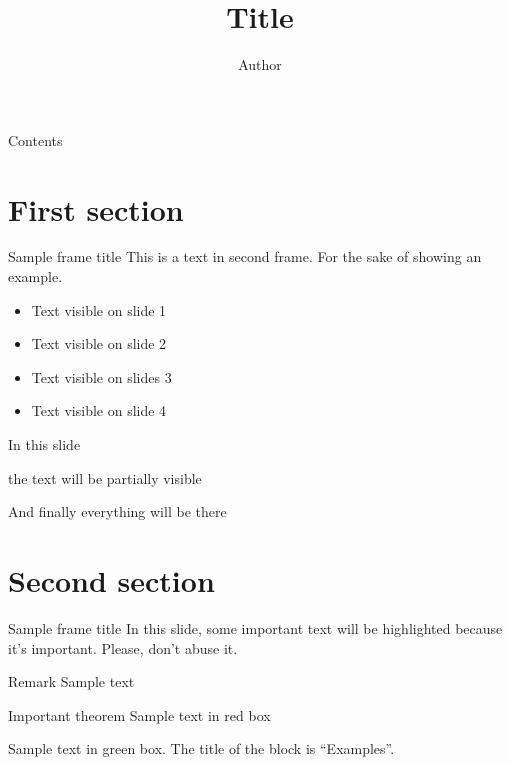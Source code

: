 \documentclass{ibeamer}
\author{Author}
\institute{Institute}
\title{Title}
\begin{document}
\frame{\titlepage}

\begin{frame}{Contents}
  \tableofcontents
\end{frame}

\section{First section}

\begin{frame}{Sample frame title}
  This is a text in second frame. For the sake of showing an example.

  \begin{itemize}
    \item<1-> Text visible on slide 1
    \item<2-> Text visible on slide 2
    \item<3> Text visible on slides 3
    \item<4-> Text visible on slide 4
  \end{itemize}
\end{frame}

\begin{frame}
  In this slide \pause

  the text will be partially visible \pause

  And finally everything will be there
\end{frame}

\section{Second section}

\begin{frame}{Sample frame title}
  In this slide, some important text will be \alert{highlighted} because it's important.
  Please, don't abuse it.

  \begin{block}{Remark}
    Sample text
  \end{block}

  \begin{alertblock}{Important theorem}
    Sample text in red box
  \end{alertblock}

  \begin{examples}
    Sample text in green box. The title of the block is ``Examples''.
  \end{examples}
\end{frame}
\end{document}
